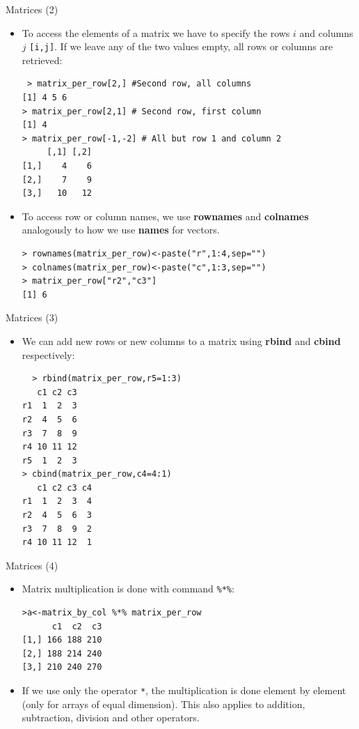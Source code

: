 \documentclass[handout]{beamer}
\begin{document}
\begin{frame}[fragile]{Matrices (2)}
\scriptsize{
 \begin{itemize}
  \item To access the elements of a matrix we have to specify the rows $i$ and columns $j$ \verb+[i,j]+. If we leave any of the two values empty, all rows or columns are retrieved:  
 \begin{verbatim}
 > matrix_per_row[2,] #Second row, all columns
[1] 4 5 6
> matrix_per_row[2,1] # Second row, first column
[1] 4
> matrix_per_row[-1,-2] # All but row 1 and column 2
     [,1] [,2]
[1,]    4    6
[2,]    7    9
[3,]   10   12 
 \end{verbatim}
\item To access row or column names, we use \textbf{rownames} and \textbf{colnames} analogously to how we use \textbf{names} for vectors.
\begin{verbatim}
> rownames(matrix_per_row)<-paste("r",1:4,sep="")
> colnames(matrix_per_row)<-paste("c",1:3,sep="")
> matrix_per_row["r2","c3"]
[1] 6
\end{verbatim}  
 \end{itemize}
 }
\end{frame}


\begin{frame}[fragile]{Matrices (3)}
\scriptsize{
\begin{itemize}
 \item We can add new rows or new columns to a matrix using \textbf{rbind} and \textbf{cbind} respectively:
 \begin{verbatim}
  > rbind(matrix_per_row,r5=1:3)
   c1 c2 c3
r1  1  2  3
r2  4  5  6
r3  7  8  9
r4 10 11 12
r5  1  2  3
> cbind(matrix_per_row,c4=4:1)
   c1 c2 c3 c4
r1  1  2  3  4
r2  4  5  6  3
r3  7  8  9  2
r4 10 11 12  1
 \end{verbatim}

\end{itemize}
 
 
 
} 
\end{frame}

\begin{frame}[fragile]{Matrices (4)}
\scriptsize{
\begin{itemize}
 \item Matrix multiplication is done with command \verb+%*%+:
 \begin{verbatim}
>a<-matrix_by_col %*% matrix_per_row
      c1  c2  c3
[1,] 166 188 210
[2,] 188 214 240
[3,] 210 240 270
 \end{verbatim}

 
\item  If we use only the operator \verb+*+, the multiplication is done element by element (only for arrays of equal dimension). This also applies to addition, subtraction, division and other operators.

\end{itemize}


 
}

\end{frame}
\end{document}
